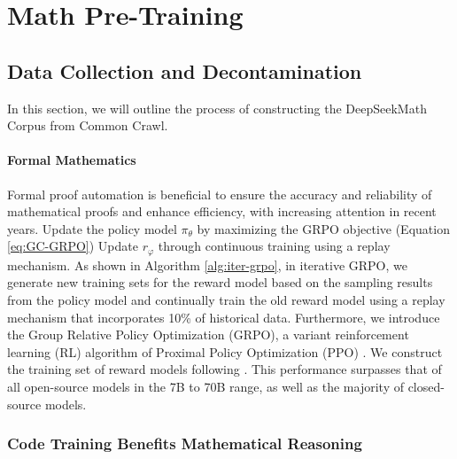 \section{Math Pre-Training}

\subsection{Data Collection and Decontamination} In this section, we will outline the process of constructing the DeepSeekMath Corpus from Common Crawl. \paragraph{Formal Mathematics}

Formal proof automation is beneficial to ensure the accuracy and reliability of mathematical proofs and enhance efficiency, with increasing attention in recent years. 
        \State Update the policy model $\pi_{\theta}$ by maximizing the GRPO objective (Equation \ref{eq:GC-GRPO})
      \EndFor
    \EndFor \State Update $r_\varphi$ through continuous training using a replay mechanism. As shown in Algorithm \ref{alg:iter-grpo}, in iterative GRPO, we generate new training sets for the reward model based on the sampling results from the policy model and continually train the old reward model using a replay mechanism that incorporates 10\% of historical data. Furthermore, we introduce the Group Relative Policy Optimization (GRPO), a variant reinforcement learning (RL) algorithm of Proximal Policy Optimization (PPO) \citep{schulman2017proximal}. We construct the training set of reward models following \citep{wang2023math}. This performance surpasses that of all open-source models in the 7B to 70B range, as well as the majority of closed-source models. \subsubsection{Code Training Benefits Mathematical Reasoning}

